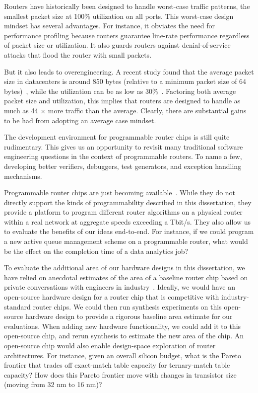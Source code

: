  Routers have historically been
designed to handle worst-case traffic patterns, \ie the smallest packet size at
100\% utilization on all ports. This worst-case design mindset has several
advantages. For instance, it obviates the need for performance profiling
because routers guarantee line-rate performance regardless of packet size or
utilization. It also guards routers against denial-of-service attacks that
flood the router with small packets.

But it also leads to overengineering. A recent study found that the average
packet size in datacenters is around 850 bytes (relative to a minimum packet
size of 64 bytes)~\cite{theo_dc}, while the utilization can be as low as
30\%~\cite{theo_dc}. Factoring both average packet size and utilization, this
implies that routers are designed to handle as much as 44 $\times$ more traffic
than the average. Clearly, there are substantial gains to be had from adopting
an average case mindset.

 The development
environment for programmable router chips is still quite rudimentary. This
gives us an opportunity to revisit many traditional software engineering
questions in the context of programmable routers. To name a few, developing
better verifiers, debuggers, test generators, and exception handling
mechanisms.

 Programmable
router chips are just becoming available~\cite{tofino}. While they do not
directly support the kinds of programmability described in this dissertation,
they provide a platform to program different router algorithms on a physical
router within a real network at aggregate speeds exceeding a Tbit/s.  They also
allow us to evaluate the benefits of our ideas end-to-end. For instance, if we
could program a new active queue management scheme on a programmable router,
what would be the effect on the completion time of a data analytics job?

 To evaluate the
additional area of our hardware designs in this dissertation, we have relied on
anecdotal estimates of the area of a baseline router chip based on private
conversations with engineers in industry~\cite{gibb_parsing}. Ideally, we would
have an open-source hardware design for a router chip that is competitive with
industry-standard router chips. We could then run synthesis experiments on this
open-source hardware design to provide a rigorous baseline area estimate for
our evaluations.  When adding new hardware functionality, we could add it to
this open-source chip, and rerun synthesis to estimate the new area of the
chip. An open-source chip would also enable design-space exploration of router
architectures. For instance, given an overall silicon budget, what is the
Pareto frontier that trades off exact-match table capacity for ternary-match
table capacity? How does this Pareto frontier move with changes in transistor
size (\eg moving from 32 nm to 16 nm)?

